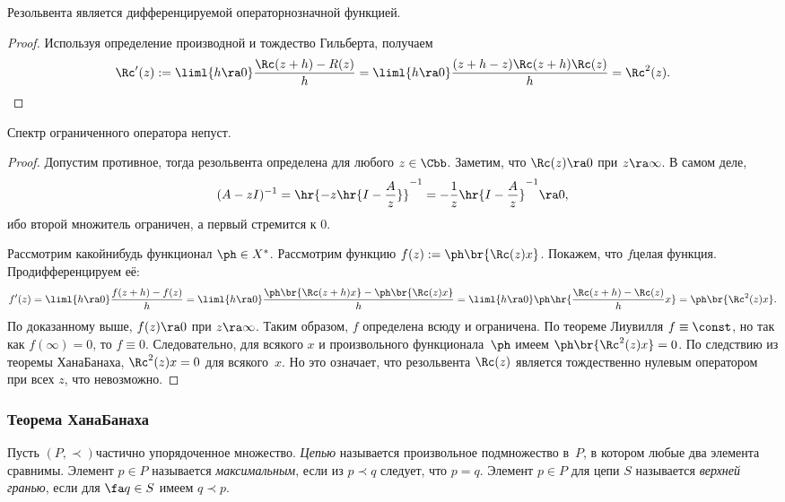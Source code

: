 \documentclass[a4paper]{article}
\begin{document}
\begin{lemma}
Резольвента является дифференцируемой операторнозначной функцией.
\end{lemma}
\begin{proof}
Используя определение производной и тождество Гильберта, получаем
$$\Rc'(z) := \liml{h \ra 0}\frac{\Rc(z+h) - R(z)}{h} = \liml{h\ra 0} \frac{(z+h-z)\Rc(z+h)\Rc(z)}{h} = \Rc^2(z).$$
\hfill\end{proof}

\begin{theorem}
Спектр ограниченного оператора непуст.
\end{theorem}
\begin{proof}
Допустим противное, тогда резольвента определена для любого $z \in \Cbb$.
Заметим, что $\Rc(z) \ra 0$ при $z \ra \infty$. В самом деле,
$$(A - zI)^{-1} = \hr{-z\hr{I - \frac{A}{z}}}^{-1} = -\frac{1}{z}\hr{I - \frac{A}{z}}^{-1} \ra 0,$$
ибо второй множитель ограничен, а первый стремится к $0$.

Рассмотрим какой\д нибудь функционал $\ph \in X^*$. Рассмотрим
функцию $f(z) := \ph\br{\Rc(z)x}$. Покажем, что $f$\т целая функция.
Продифференцируем её:
$$f'(z) = \liml{h\ra0}\frac{f(z+h) - f(z)}{h} = \liml{h\ra0}\frac{\ph\br{\Rc(z+h)x} - \ph\br{\Rc(z)x}}{h} = \liml{h\ra0}\ph\hr{\frac{\Rc(z+h)-\Rc(z)}{h}x} = \ph\br{\Rc^2(z)x}.$$
По доказанному выше, $f(z) \ra 0$ при $z \ra \infty$. Таким образом, $f$ определена всюду
и ограничена. По теореме Лиувилля $f \equiv \const$, но так как
$f(\infty)=0$, то $f \equiv 0$. Следовательно, для всякого $x$ и произвольного функционала~$\ph$
имеем $\ph\br{\Rc^2(z)x}=0$. По следствию из теоремы Хана\ч Банаха, $\Rc^2(z)x = 0$ для всякого~$x$.
Но это означает, что резольвента $\Rc(z)$ является тождественно нулевым оператором при
всех $z$, что невозможно.
\end{proof}


\subsubsection{Теорема Хана\ч Банаха}

\begin{df}
Пусть $(P, \prec)$\т частично упорядоченное множество. \emph{Цепью} называется
произвольное  подмножество в~$P$, в котором любые два элемента сравнимы.
Элемент $p \in P$ называется \emph{максимальным}, если из $p \prec q$ следует, что $p=q$.
Элемент $p\in P$ для цепи $S$ называется \emph{верхней гранью}, если для $\fa q \in S$ имеем $q \prec p$.
\end{df}
\end{document}
